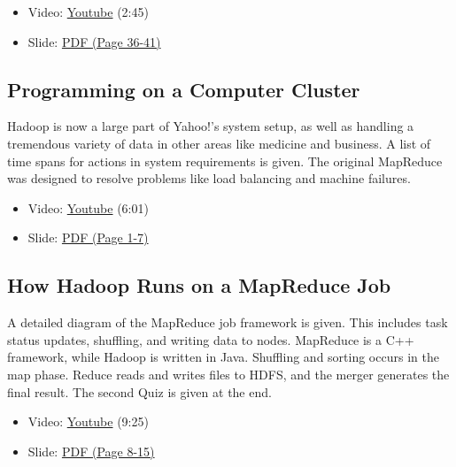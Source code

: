 \begin{itemize}
\tightlist
\item
  Video: \href{https://www.youtube.com/watch?v=a3AlOTmD42k}{Youtube}
  (2:45)
\item
  Slide:
  \href{https://drive.google.com/open?id=0B88HKpainTSfMnpCelpNQUpNdVE}{PDF
  (Page 36-41)}
\end{itemize}

\subsection{Programming on a Computer
Cluster}\label{programming-on-a-computer-cluster}

Hadoop is now a large part of Yahoo!'s system setup, as well as handling
a tremendous variety of data in other areas like medicine and business.
A list of time spans for actions in system requirements is given. The
original MapReduce was designed to resolve problems like load balancing
and machine failures.

\begin{itemize}
\tightlist
\item
  Video: \href{https://www.youtube.com/watch?v=rRR2ALa5CUA}{Youtube}
  (6:01)
\item
  Slide:
  \href{https://drive.google.com/open?id=0B88HKpainTSfd3hkTG4yY2FYUVE}{PDF
  (Page 1-7)}
\end{itemize}

\subsection{How Hadoop Runs on a MapReduce
Job}\label{how-hadoop-runs-on-a-mapreduce-job}

A detailed diagram of the MapReduce job framework is given. This
includes task status updates, shuffling, and writing data to nodes.
MapReduce is a C++ framework, while Hadoop is written in Java. Shuffling
and sorting occurs in the map phase. Reduce reads and writes files to
HDFS, and the merger generates the final result. The second Quiz is
given at the end.

\begin{itemize}
\tightlist
\item
  Video: \href{https://www.youtube.com/watch?v=KWLY_maNEPA}{Youtube}
  (9:25)
\end{itemize}

\begin{itemize}
\tightlist
\item
  Slide:
  \href{https://drive.google.com/open?id=0B88HKpainTSfd3hkTG4yY2FYUVE}{PDF
  (Page 8-15)}
\end{itemize}

